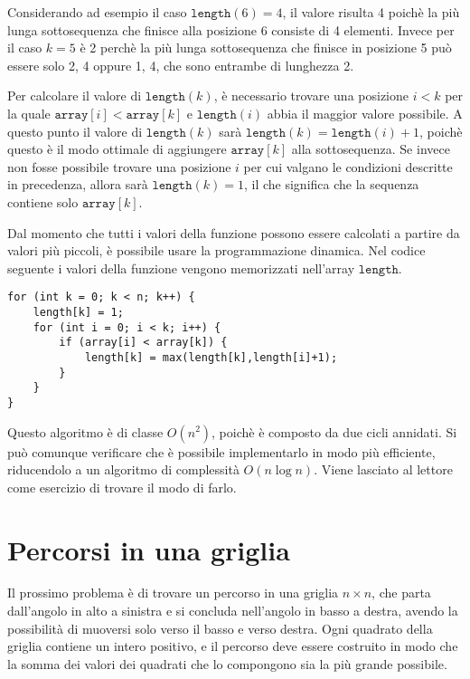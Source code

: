 Considerando ad esempio il caso $\texttt{length}(6)=4$,
il valore risulta 4 poichè la più lunga sottosequenza che
finisce alla posizione 6 consiste di 4 elementi. Invece per il caso $k=5$
è 2 perchè la più lunga sottosequenza che finisce in posizione 5 può essere
solo {2, 4} oppure {1, 4}, che sono entrambe di lunghezza 2.

Per calcolare il valore di $\texttt{length}(k)$,
è necessario trovare una posizione $i<k$
per la quale $\texttt{array}[i]<\texttt{array}[k]$
e $\texttt{length}(i)$ abbia il maggior valore possibile.
A questo punto il valore di $\texttt{length}(k)$ 
sarà $\texttt{length}(k)=\texttt{length}(i)+1$,
poichè questo è il modo ottimale di aggiungere
$\texttt{array}[k]$ alla sottosequenza.
Se invece non fosse possibile trovare una posizione $i$
per cui valgano le condizioni descritte in precedenza,
allora sarà $\texttt{length}(k)=1$,
il che significa che la sequenza contiene solo
$\texttt{array}[k]$.

Dal momento che tutti i valori della funzione possono essere
calcolati a partire da valori più piccoli,
è possibile usare la programmazione dinamica.
Nel codice seguente i valori della funzione
vengono memorizzati nell'array
$\texttt{length}$.

\begin{lstlisting}
for (int k = 0; k < n; k++) {
    length[k] = 1;
    for (int i = 0; i < k; i++) {
        if (array[i] < array[k]) {
            length[k] = max(length[k],length[i]+1);
        }
    }
}
\end{lstlisting}

Questo algoritmo è di classe $O(n^2)$,
poichè è composto da due cicli annidati.
Si può comunque verificare che è possibile 
implementarlo in modo più efficiente, 
riducendolo a un algoritmo di complessità $O(n \log n)$.
Viene lasciato al lettore come esercizio di trovare il modo di farlo.

\section{Percorsi in una griglia}

Il prossimo problema è di trovare un percorso
in una griglia $n \times n$, che parta dall'angolo in alto 
a sinistra e si concluda nell'angolo in basso 
a destra, avendo la possibilità di muoversi solo
verso il basso e verso destra.
Ogni quadrato della griglia contiene un intero positivo,
e il percorso deve essere costruito in modo
che la somma dei valori dei quadrati che lo 
compongono sia la più grande possibile.

